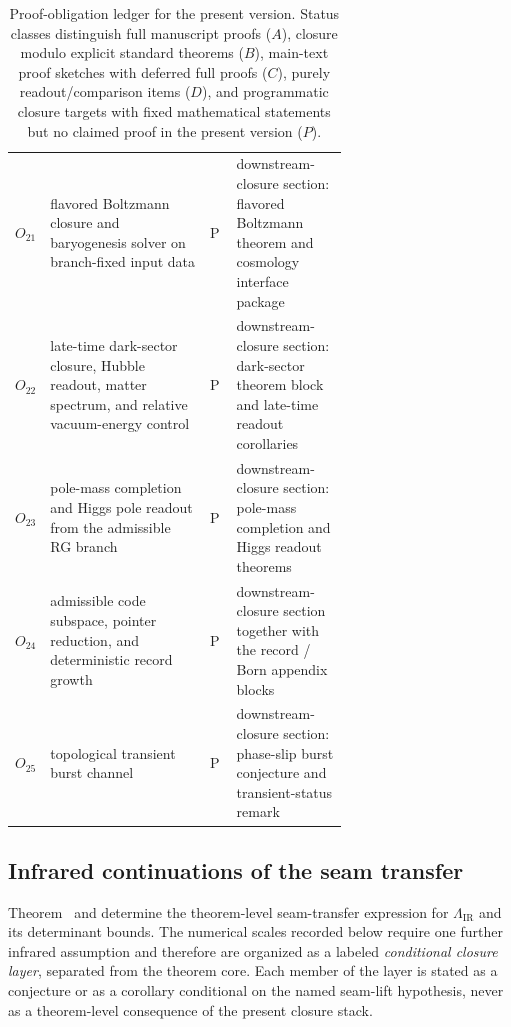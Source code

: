 \begin{table}[p]
\begin{tabularx}{\linewidth}{@{}>{\raggedright\arraybackslash}p{0.10\linewidth}>{\raggedright\arraybackslash}p{0.48\linewidth}>{\centering\arraybackslash}p{0.08\linewidth}Y@{}}
$O_{21}$ & flavored Boltzmann closure and baryogenesis solver on branch-fixed input data & P & downstream-closure section: flavored Boltzmann theorem and cosmology interface package \\
$O_{22}$ & late-time dark-sector closure, Hubble readout, matter spectrum, and relative vacuum-energy control & P & downstream-closure section: dark-sector theorem block and late-time readout corollaries \\
$O_{23}$ & pole-mass completion and Higgs pole readout from the admissible RG branch & P & downstream-closure section: pole-mass completion and Higgs readout theorems \\
$O_{24}$ & admissible code subspace, pointer reduction, and deterministic record growth & P & downstream-closure section together with the record / Born appendix blocks \\
$O_{25}$ & topological transient burst channel & P & downstream-closure section: phase-slip burst conjecture and transient-status remark \\
\bottomrule
\end{tabularx}
\caption{Proof-obligation ledger for the present version. Status classes distinguish full manuscript proofs ($A$), closure modulo explicit standard theorems ($B$), main-text proof sketches with deferred full proofs ($C$), purely readout/comparison items ($D$), and programmatic closure targets with fixed mathematical statements but no claimed proof in the present version ($P$).}
\label{tab:proof-obligation-ledger}
\end{table}


\subsection{Infrared continuations of the seam transfer}
\label{app:ir-seam-continuations}

Theorem~ and  determine the
theorem-level seam-transfer expression for $\Lambda_{\mathrm{IR}}$ and its determinant bounds.
The numerical scales recorded below require one further infrared assumption and therefore are
organized as a labeled \emph{conditional closure layer}, separated from the theorem core. Each
member of the layer is stated as a conjecture or as a corollary conditional on the named seam-lift
hypothesis, never as a theorem-level consequence of the present closure stack.

